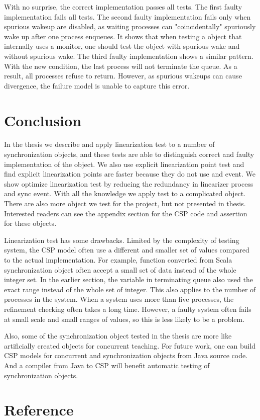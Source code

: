 \documentclass[a4paper, 12pt]{article}
\begin{document}
With no surprise, the correct implementation passes all tests. The first faulty implementation fails all tests. The second faulty implementation fails only when spurious wakeup are disabled, as waiting processes can "coincidentally" spuriously wake up after one process enqueues. It shows that when testing a object that internally uses a monitor, one should test the object with spurious wake and without spurious wake. The third faulty implementation shows a similar pattern. With the new condition, the last process will not terminate the queue. As a result, all processes refuse to return. However, as spurious wakeups can cause divergence, the failure model is unable to capture this error. 

\section{Conclusion}
In the thesis we describe and apply linearization test to a number of synchronization objects, and these tests are able to distinguish correct and faulty implementation of the object. We also use explicit linearization point test and find explicit linearization points are faster because they do not use  and  event. We show optimize linearization test by reducing the redundancy in linearizer process and sync event. With all the knowledge we apply test to a complicated object. There are also more object we test for the project, but not presented in thesis. Interested readers can see the appendix section for the CSP code and assertion for these objects. 

Linearization test has some drawbacks. Limited by the complexity of testing system, the CSP model often use a different and smaller set of values compared to the actual implementation. For example, function converted from Scala synchronization object often accept a small set of data instead of the whole integer set. In the earlier section, the variable  in terminating queue also used the exact range instead of the whole set of integer. This also applies to the number of processes in the system. When a system uses more than five processes, the refinement checking often takes a long time. However, a faulty system often fails at small scale and small ranges of values, so this is less likely to be a problem. 

Also, some of the synchronization object tested in the thesis are more like artificially created objects for concurrent teaching. For future work, one can build CSP models for concurrent and synchronization objects from Java source code. And a compiler from Java to CSP will benefit automatic testing of synchronization objects. 
\section{Reference}


\end{document}
